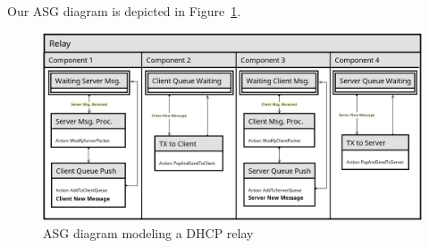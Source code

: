 Our ASG diagram is depicted in Figure~\ref{fig:asg}.

\begin{figure}[h]
	\centering\includegraphics[scale=0.5]{images/asg-diagram}
	\caption{ASG diagram modeling a DHCP relay}
	\label{fig:asg}
\end{figure}

